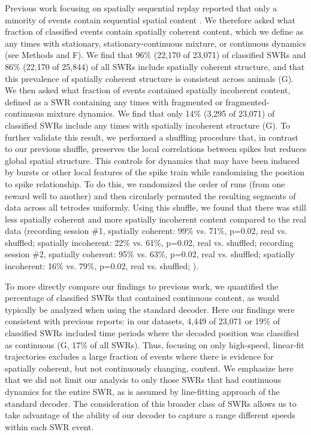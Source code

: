 \documentclass[9pt,lineno]{elife}
\begin{document}
Previous work focusing on spatially sequential replay reported that only a minority of events contain sequential spatial content \citep{FosterReversereplaybehavioural2006, KarlssonAwakereplayremote2009, DavidsonHippocampalReplayExtended2009}. We therefore asked what fraction of classified events contain spatially coherent content, which we define as any times with stationary, stationary-continuous mixture, or continuous dynamics (see Methods and F). We find that 96\% (22,170 of 23,071) of classified SWRs and 86\% (22,170 of 25,844) of all SWRs include spatially coherent structure, and that this prevalence of spatially coherent structure is consistent across animals (G). We then asked what fraction of events contained spatially incoherent content, defined as a SWR containing any times with fragmented or fragmented-continuous mixture dynamics. We find that only 14\% (3,295 of 23,071) of classified SWRs include any times with spatially incoherent structure (G). To further validate this result, we performed a shuffling procedure that, in contrast to our previous shuffle, preserves the local correlations between spikes but reduces global spatial structure. This controls for dynamics that may have been induced by bursts or other local features of the spike train while randomizing the position to spike relationship. To do this, we randomized the order of runs (from one reward well to another) and then circularly permuted the resulting segments of data across all tetrodes uniformly. Using this shuffle, we found that there was still less spatially coherent and more spatially incoherent content compared to the real data (recording session \#1, spatially coherent: 99\% vs. 71\%, p=0.02, real vs. shuffled; spatially incoherent: 22\% vs. 61\%, p=0.02, real vs. shuffled; recording session \#2, spatially coherent: 95\% vs. 63\%, p=0.02, real vs. shuffled; spatially incoherent: 16\% vs. 79\%, p=0.02, real vs. shuffled; ).

To more directly compare our findings to previous work, we quantified the percentage of classified SWRs that contained continuous content, as would typically be analyzed when using the standard decoder. Here our findings were consistent with previous reports: in our datasets, 4,449 of 23,071 or 19\% of classified SWRs included time periods where the decoded position was classified as continuous (G, 17\% of all SWRs). Thus, focusing on only high-speed, linear-fit trajectories excludes a large fraction of events where there is evidence for spatially coherent, but not continuously changing, content. We emphasize here that we did not limit our analysis to only those SWRs that had continuous dynamics for the entire SWR, as is assumed by line-fitting approach of the standard decoder. The consideration of this broader class of SWRs allows us to take advantage of the ability of our decoder to capture a range different speeds within each SWR event.
\end{document}
